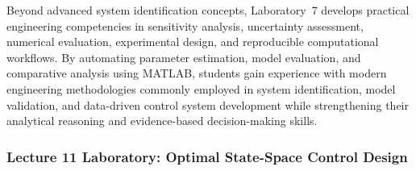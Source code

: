 \documentclass[journal]{IEEEtran}
\begin{document}
\medskip

Beyond advanced system identification concepts, Laboratory~7 develops practical engineering competencies in sensitivity analysis, uncertainty assessment, numerical evaluation, experimental design, and reproducible computational workflows.
By automating parameter estimation, model evaluation, and comparative analysis using MATLAB, students gain experience with modern engineering methodologies commonly employed in system identification, model validation, and data-driven control system development while strengthening their analytical reasoning and evidence-based decision-making skills.

\medskip
\subsubsection{Lecture 11 Laboratory: Optimal State-Space Control Design}


\end{document}
